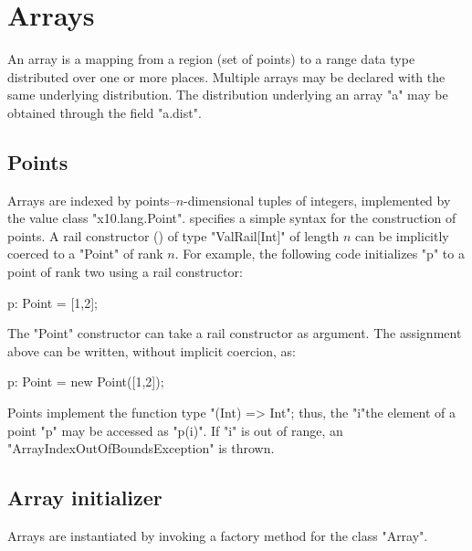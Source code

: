 \chapter{Arrays}\label{XtenArrays}

An array is a mapping from a region (set of points) to a range data
type distributed over one or more places.
Multiple arrays may be declared with the same underlying
distribution.
The distribution underlying an array \xcd"a" may be obtained through
the field \xcd"a.dist".

\section{Points}\label{point-syntax}

Arrays are indexed by points--$n$-dimensional tuples of
integers, implemented by the value class \xcd"x10.lang.Point".
\Xten{} specifies a simple syntax for the construction of points.
A rail constructor () of type \xcd"ValRail[Int]"
of length $n$
can be implicitly coerced to a \xcd"Point" of rank $n$.  For
example, the following code initializes \xcd"p" to a point of
rank two using a rail constructor:

\begin{xten}
p: Point = [1,2];
\end{xten}

The \xcd"Point" constructor can take a rail constructor as
argument.  The assignment above can be written, without
implicit coercion, as:

\begin{xten}
p: Point = new Point([1,2]);
\end{xten}

Points implement the function type \xcd"(Int) => Int"; thus, the
\xcd"i"the element of a point \xcd"p" may be accessed as \xcd"p(i)".
If \xcd"i" is out of range, an
\xcd"ArrayIndexOutOfBoundsException" is thrown.



\section{Array initializer}\label{ArrayInitializer}\label{array!creation}

Arrays are instantiated by invoking a factory method for the
class \xcd"Array".


